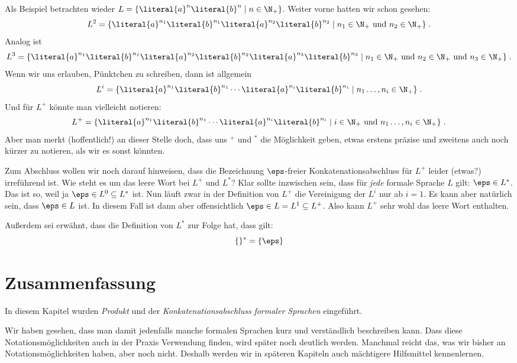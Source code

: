 Als Beispiel betrachten wieder $L = \{ \literal{a}^n\literal{b}^n \mid
n\in\N_+\}$. 
%
Weiter vorne hatten wir schon gesehen:
%
\[
L^2 = \{ \literal{a}^{n_1}\literal{b}^{n_1}\literal{a}^{n_2}\literal{b}^{n_2}
\mid n_1\in\N_+  \text{ und }  n_2\in\N_+ \} \;.
\]
%
Analog ist 
%
\[
L^3 = \{ \literal{a}^{n_1}\literal{b}^{n_1}\literal{a}^{n_2}\literal{b}^{n_2}
\literal{a}^{n_3}\literal{b}^{n_3} \mid n_1\in\N_+  \text{ und }  n_2\in\N_+  \text{ und } 
n_3\in\N_+ \} \;.
\]
%
Wenn wir uns erlauben, Pünktchen zu schreiben, dann ist allgemein
%
\[
L^i = \{
\literal{a}^{n_1}\literal{b}^{n_1}\cdots \literal{a}^{n_i}\literal{b}^{n_i}
\mid n_1\ldots, n_i\in\N_+ \} \;.
\]
Und für $L^+$ könnte man vielleicht notieren:
\[
L^+ = \{
\literal{a}^{n_1}\literal{b}^{n_1}\cdots \literal{a}^{n_i}\literal{b}^{n_i}
\mid i\in\N_+  \text{ und }   n_1\ldots, n_i\in\N_+ \} \;.
\]
Aber man merkt (hoffentlich!) an dieser Stelle doch, dass uns $^+$ und $^*$
die Möglichkeit geben, etwas erstens präzise und zweitens auch noch kürzer zu
notieren, als wir es sonst könnten.

Zum Abschluss wollen wir noch darauf hinweisen, dass die Bezeichnung
$\eps$-freier Konkatenationsabschluss für $L^+$ leider (etwas?) irreführend
ist. 
%
Wie steht es um das leere Wort bei $L^+$ und $L^*$? Klar sollte
inzwischen sein, dass für \emph{jede} formale Sprache $L$ gilt: $\eps\in
L^*$. 
%
Das ist so, weil ja $\eps\in L^0\subseteq L^*$ ist.
%
Nun läuft zwar in der Definition von $L^+$
die Vereinigung der $L^i$
nur ab $i=1$.
%
Es kann aber natürlich sein, dass $\eps\in L$ ist.
%
In diesem Fall ist dann aber offensichtlich $\eps\in L=L^1\subseteq L^+$.
Also kann $L^+$ sehr wohl das leere Wort enthalten.

Außerdem sei erwähnt, dass die Definition von $L^*$ zur Folge hat, dass gilt:
\[
\{\}^* = \{\eps\}
\]

\section{Zusammenfassung}

In diesem Kapitel wurden \emph{Produkt} und der \emph{Konkatenationsabschluss}
\emph{formaler Sprachen} eingeführt.

Wir haben gesehen, dass man damit jedenfalls manche formalen Sprachen kurz und
verständlich beschreiben kann. 
%
Dass diese Notationsmöglichkeiten auch in der Praxis Verwendung finden, wird
später noch deutlich werden.
%
Manchmal reicht das, was wir bisher an Notationsmöglichkeiten haben, aber noch
nicht.
%
Deshalb werden wir in späteren Kapiteln auch mächtigere Hilfsmittel
kennenlernen.
 
\cleardoublepage

